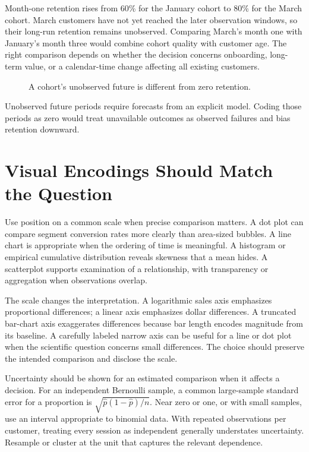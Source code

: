 Month-one retention rises from 60\% for the January cohort to 80\% for
the March cohort. March customers have not yet reached the later
observation windows, so their long-run retention remains unobserved.
Comparing March's month one with January's month three would combine
cohort quality with customer age. The right comparison depends on
whether the decision concerns onboarding, long-term value, or a
calendar-time change affecting all existing customers.

\begin{figure}[htbp]
\centering

\caption{A cohort’s unobserved future is different from zero retention.}\label{fig:M02_cohort_triangle}
\end{figure}

Unobserved future periods require forecasts from an explicit model.
Coding those periods as zero would treat unavailable outcomes as
observed failures and bias retention downward.

\hypertarget{M02-visual-encodings-should-match-the-question}{%
\section{Visual Encodings Should Match the
Question}\label{M02-visual-encodings-should-match-the-question}}

\noindent Use position on a common scale when precise comparison matters. A dot
plot can compare segment conversion rates more clearly than area-sized
bubbles. A line chart is appropriate when the ordering of time is
meaningful. A histogram or empirical cumulative distribution reveals
skewness that a mean hides. A scatterplot supports examination of a
relationship, with transparency or aggregation when observations
overlap.

The scale changes the interpretation. A logarithmic sales axis
emphasizes proportional differences; a linear axis emphasizes dollar
differences. A truncated bar-chart axis exaggerates differences because
bar length encodes magnitude from its baseline. A carefully labeled
narrow axis can be useful for a line or dot plot when the scientific
question concerns small differences. The choice should preserve the
intended comparison and disclose the scale.

Uncertainty should be shown for an estimated comparison when it affects
a decision. For an independent Bernoulli sample, a common large-sample
standard error for a proportion is \(\sqrt{\hat p(1-\hat p)/n}\). Near
zero or one, or with small samples, use an interval appropriate to
binomial data. With repeated observations per customer, treating every
session as independent generally understates uncertainty. Resample or
cluster at the unit that captures the relevant dependence.

